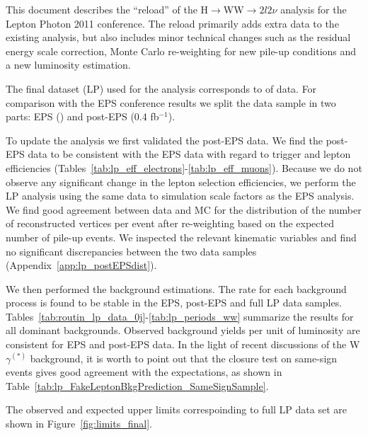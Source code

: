 
This document describes the ``reload'' of the H$\to$WW$\to2l2\nu$
analysis for the Lepton Photon 2011 conference.  The reload primarily
adds extra data to the existing analysis, but also includes minor
technical changes such as the residual energy scale correction, Monte
Carlo re-weighting for new pile-up conditions and a new luminosity
estimation.

The final dataset (LP) used for the analysis corresponds to \lpintlumi
of data. For comparison with the EPS conference results we split the
data sample in two parts: EPS (\intlumi) and post-EPS (0.4 fb$^{-1}$).

To update the analysis we first validated the post-EPS data. We find
the post-EPS data to be consistent with the EPS data with regard to
trigger and lepton efficiencies
(Tables~\ref{tab:lp_eff_electrons}-\ref{tab:lp_eff_muons}). Because we
do not observe any significant change in the lepton selection
efficiencies, we perform the LP analysis using the same data to
simulation scale factors as the EPS analysis. We find good agreement
between data and MC for the distribution of the number of
reconstructed vertices per event after re-weighting based on the
expected number of pile-up events.  We inspected the relevant
kinematic variables and find no significant discrepancies between the
two data samples (Appendix~\ref{app:lp_postEPSdist}).

We then performed the background estimations. The rate for each
background process is found to be stable in the EPS, post-EPS and full
LP data
samples. Tables~\ref{tab:routin_lp_data_0j}-\ref{tab:lp_periods_ww}
summarize the results for all dominant backgrounds. Observed
background yields per unit of luminosity are consistent for EPS
and post-EPS data. In the light of recent discussions of the
W$\gamma^{(*)}$ background, it is worth to point out that the closure
test on same-sign events gives good agreement with the expectations,
as shown in Table~\ref{tab:lp_FakeLeptonBkgPrediction_SameSignSample}.

The observed and expected upper limits correspoinding to full LP data
set are shown in Figure~\ref{fig:limits_final}.

